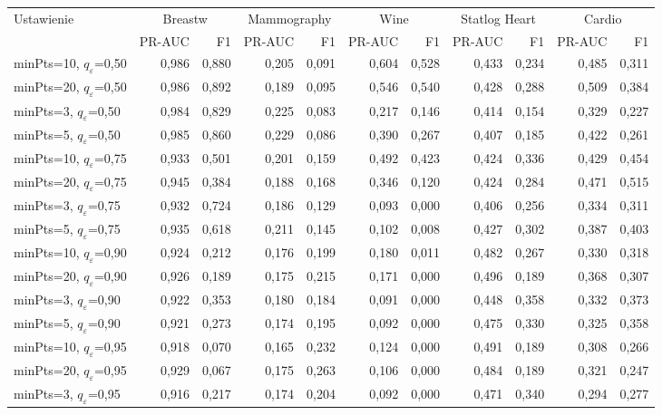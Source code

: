 \begin{longtable}{lrrrrrrrrrr}
\toprule
Ustawienie & \multicolumn{2}{c}{Breastw} & \multicolumn{2}{c}{Mammography} & \multicolumn{2}{c}{Wine} & \multicolumn{2}{c}{Statlog Heart} & \multicolumn{2}{c}{Cardio} \\
 & PR-AUC & F1 & PR-AUC & F1 & PR-AUC & F1 & PR-AUC & F1 & PR-AUC & F1 \\
\midrule
\endhead
minPts=10, $q_\varepsilon$=0,50 & 0,986 & 0,880 & 0,205 & 0,091 & 0,604 & 0,528 & 0,433 & 0,234 & 0,485 & 0,311 \\
minPts=20, $q_\varepsilon$=0,50 & 0,986 & 0,892 & 0,189 & 0,095 & 0,546 & 0,540 & 0,428 & 0,288 & 0,509 & 0,384 \\
minPts=3, $q_\varepsilon$=0,50 & 0,984 & 0,829 & 0,225 & 0,083 & 0,217 & 0,146 & 0,414 & 0,154 & 0,329 & 0,227 \\
minPts=5, $q_\varepsilon$=0,50 & 0,985 & 0,860 & 0,229 & 0,086 & 0,390 & 0,267 & 0,407 & 0,185 & 0,422 & 0,261 \\
minPts=10, $q_\varepsilon$=0,75 & 0,933 & 0,501 & 0,201 & 0,159 & 0,492 & 0,423 & 0,424 & 0,336 & 0,429 & 0,454 \\
minPts=20, $q_\varepsilon$=0,75 & 0,945 & 0,384 & 0,188 & 0,168 & 0,346 & 0,120 & 0,424 & 0,284 & 0,471 & 0,515 \\
minPts=3, $q_\varepsilon$=0,75 & 0,932 & 0,724 & 0,186 & 0,129 & 0,093 & 0,000 & 0,406 & 0,256 & 0,334 & 0,311 \\
minPts=5, $q_\varepsilon$=0,75 & 0,935 & 0,618 & 0,211 & 0,145 & 0,102 & 0,008 & 0,427 & 0,302 & 0,387 & 0,403 \\
minPts=10, $q_\varepsilon$=0,90 & 0,924 & 0,212 & 0,176 & 0,199 & 0,180 & 0,011 & 0,482 & 0,267 & 0,330 & 0,318 \\
minPts=20, $q_\varepsilon$=0,90 & 0,926 & 0,189 & 0,175 & 0,215 & 0,171 & 0,000 & 0,496 & 0,189 & 0,368 & 0,307 \\
minPts=3, $q_\varepsilon$=0,90 & 0,922 & 0,353 & 0,180 & 0,184 & 0,091 & 0,000 & 0,448 & 0,358 & 0,332 & 0,373 \\
minPts=5, $q_\varepsilon$=0,90 & 0,921 & 0,273 & 0,174 & 0,195 & 0,092 & 0,000 & 0,475 & 0,330 & 0,325 & 0,358 \\
minPts=10, $q_\varepsilon$=0,95 & 0,918 & 0,070 & 0,165 & 0,232 & 0,124 & 0,000 & 0,491 & 0,189 & 0,308 & 0,266 \\
minPts=20, $q_\varepsilon$=0,95 & 0,929 & 0,067 & 0,175 & 0,263 & 0,106 & 0,000 & 0,484 & 0,189 & 0,321 & 0,247 \\
minPts=3, $q_\varepsilon$=0,95 & 0,916 & 0,217 & 0,174 & 0,204 & 0,092 & 0,000 & 0,471 & 0,340 & 0,294 & 0,277 \\

\end{longtable}
